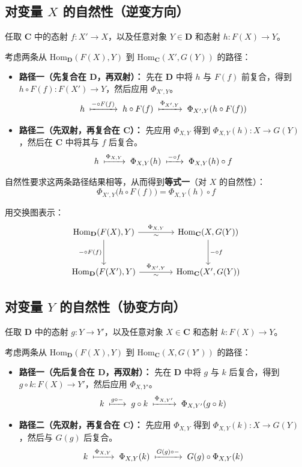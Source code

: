 \documentclass[12pt,a4paper]{ctexart}
\theoremstyle{definition}
\newcommand{\cat}[1]{\mathbf{#1}}
\newcommand{\Hom}{\mathrm{Hom}}
\begin{document}
\subsection{对变量 $X$ 的自然性（逆变方向）}

任取 $\cat{C}$ 中的态射 $f: X' \to X$，以及任意对象 $Y \in \cat{D}$ 和态射 $h: F(X) \to Y$。

考虑两条从 $\Hom_{\cat{D}}(F(X), Y)$ 到 $\Hom_{\cat{C}}(X', G(Y))$ 的路径：

\begin{itemize}[nosep]
    \item \textbf{路径一（先复合在 $\cat{D}$，再双射）：}
    先在 $\cat{D}$ 中将 $h$ 与 $F(f)$ 前复合，得到 $h \circ F(f): F(X') \to Y$，然后应用 $\Phi_{X',Y}$。
    \[
    h \;\xmapsto{-\circ F(f)}\; h \circ F(f) \;\xmapsto{\Phi_{X',Y}}\; \Phi_{X',Y}(h \circ F(f))
    \]

    \item \textbf{路径二（先双射，再复合在 $\cat{C}$）：}
    先应用 $\Phi_{X,Y}$ 得到 $\Phi_{X,Y}(h): X \to G(Y)$，然后在 $\cat{C}$ 中将其与 $f$ 后复合。
    \[
    h \;\xmapsto{\Phi_{X,Y}}\; \Phi_{X,Y}(h) \;\xmapsto{-\circ f}\; \Phi_{X,Y}(h) \circ f
    \]
\end{itemize}

自然性要求这两条路径结果相等，从而得到\textbf{等式一}（对 $X$ 的自然性）：
\begin{equation}\label{eq:natural-X}
\boxed{\; \Phi_{X',Y}\bigl(h \circ F(f)\bigr) = \Phi_{X,Y}(h) \circ f \;}
\end{equation}

用交换图表示：
\[
\begin{tikzcd}[column sep=4em, row sep=3em]
\Hom_{\cat{D}}(F(X), Y) \arrow[r,"\Phi_{X,Y}","\sim"'] \arrow[d,"-\circ F(f)"'] & \Hom_{\cat{C}}(X, G(Y)) \arrow[d,"-\circ f"] \\
\Hom_{\cat{D}}(F(X'), Y) \arrow[r,"\Phi_{X',Y}","\sim"'] & \Hom_{\cat{C}}(X', G(Y))
\end{tikzcd}
\]

\subsection{对变量 $Y$ 的自然性（协变方向）}

任取 $\cat{D}$ 中的态射 $g: Y \to Y'$，以及任意对象 $X \in \cat{C}$ 和态射 $k: F(X) \to Y$。

考虑两条从 $\Hom_{\cat{D}}(F(X), Y)$ 到 $\Hom_{\cat{C}}(X, G(Y'))$ 的路径：

\begin{itemize}[nosep]
    \item \textbf{路径一（先后复合在 $\cat{D}$，再双射）：}
    先在 $\cat{D}$ 中将 $g$ 与 $k$ 后复合，得到 $g \circ k: F(X) \to Y'$，然后应用 $\Phi_{X,Y'}$。
    \[
    k \;\xmapsto{g\circ-}\; g \circ k \;\xmapsto{\Phi_{X,Y'}}\; \Phi_{X,Y'}(g \circ k)
    \]

    \item \textbf{路径二（先双射，再复合在 $\cat{C}$）：}
    先应用 $\Phi_{X,Y}$ 得到 $\Phi_{X,Y}(k): X \to G(Y)$，然后与 $G(g)$ 后复合。
    \[
    k \;\xmapsto{\Phi_{X,Y}}\; \Phi_{X,Y}(k) \;\xmapsto{G(g)\circ-}\; G(g) \circ \Phi_{X,Y}(k)
    \]
\end{itemize}
\end{document}
